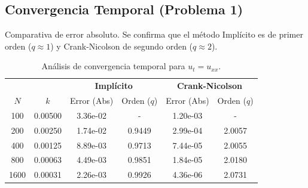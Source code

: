 \documentclass{article}
\begin{document}
\hypertarget{tablas_implicito_p1}{\subsection{Convergencia Temporal (Problema 1)}}
Comparativa de error absoluto. Se confirma que el método Implícito es de primer orden ($q \approx 1$) y Crank-Nicolson de segundo orden ($q \approx 2$).

\begin{table}[h!]
	\centering
	\begin{tabular}{|cc|cc|cc|}
		\toprule
		     &         & \multicolumn{2}{c|}{\textbf{Implícito}} & \multicolumn{2}{c}{\textbf{Crank-Nicolson}}                             \\
		$N$  & $k$     & Error (Abs)                             & Orden ($q$)                                 & Error (Abs) & Orden ($q$) \\
		\midrule
		100  & 0.00500 & 3.36e-02                                & -                                           & 1.20e-03    & -           \\
		200  & 0.00250 & 1.74e-02                                & 0.9449                                      & 2.99e-04    & 2.0057      \\
		400  & 0.00125 & 8.89e-03                                & 0.9713                                      & 7.44e-05    & 2.0055      \\
		800  & 0.00063 & 4.49e-03                                & 0.9851                                      & 1.84e-05    & 2.0180      \\
		1600 & 0.00031 & 2.26e-03                                & 0.9926                                      & 4.36e-06    & 2.0731      \\
		\bottomrule
	\end{tabular}
	\caption{Análisis de convergencia temporal para $u_t = u_{xx}$.}
	\label{tab:p1_temporal}
\end{table}
\end{document}
